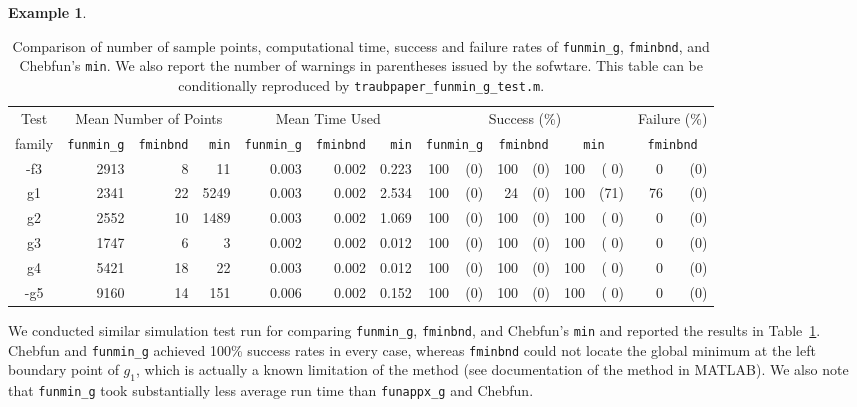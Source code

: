 \documentclass[review]{elsarticle}
\theoremstyle{definition}
\newtheorem{exmp}{Example}
\newcommand{\funappxg}{\texttt{funappx\_g\xspace}}
\newcommand{\funming}{\texttt{funmin\_g\xspace}}
\newcommand{\fminbnd}{\texttt{fminbnd\xspace}}
\begin{document}
\begin{exmp}
%
\begin{table}[bth]
\centering
\caption{Comparison of number of sample points, computational time, success and
failure rates of \funming, \fminbnd, and
Chebfun's \texttt{min}. We also report the number of warnings in parentheses issued by the
sofwtare. This table can be conditionally reproduced by
\texttt{traubpaper\_funmin\_g\_test.m}.}
\label{tab:funmingVsfminbndVsChebfun}
{\footnotesize
\setlength{\tabcolsep}{.11em} %
\begin{tabular}{|c|rrr|rrr|rrrrrr|rr|}
\hline
    Test      &     \multicolumn{3}{c|}{Mean Number of Points} & \multicolumn{3}{c|}{Mean Time Used}  & \multicolumn{6}{|c|}{Success (\%)} &  \multicolumn{2}{c|}{Failure (\%)}
\\  family &  \funming  &  \fminbnd    &  \texttt{min}    & \funming     &  \fminbnd     & \texttt{min}      & \multicolumn{2}{c}{\funming} & \multicolumn{2}{c}{\fminbnd} & \multicolumn{2}{c}{\texttt{min}}  & \multicolumn{2}{|c|}{\fminbnd}
\\ \hline
         -f3   &  2913   &   8   &      11    &   0.003   &    0.002    &  0.223  &    100   &  (0) &  100   &  (0) &  100   &   ( 0)   &   0   & (0)
\\        g1   &  2341   &  22   &    5249    &   0.003   &    0.002    &  2.534  &    100   &  (0) &  24    &  (0) &  100   &   (71)   &   76  & (0)
\\        g2   &  2552   &  10   &    1489    &   0.003   &    0.002    &  1.069  &    100   &  (0) &  100   &  (0) &  100   &   ( 0)   &   0   & (0)
\\        g3   &  1747   &   6   &       3    &   0.002   &    0.002    &  0.012  &    100   &  (0) &  100   &  (0) &  100   &   ( 0)   &   0   & (0)
\\        g4   &  5421   &  18   &      22    &   0.003   &    0.002    &  0.012  &    100   &  (0) &  100   &  (0) &  100   &   ( 0)   &   0   & (0)
\\       -g5   &  9160   &  14   &     151    &   0.006   &    0.002    &  0.152  &    100   &  (0) &  100   &  (0) &  100   &   ( 0)   &   0   & (0)

\\ \hline
\end{tabular}
}
\end{table}
%

We conducted similar simulation test run for comparing \funming, \fminbnd, and
Chebfun's \texttt{min} and reported the results in
Table~\ref{tab:funmingVsfminbndVsChebfun}. Chebfun and \funming{} achieved 100\%
success rates in every case, whereas \fminbnd{} could not locate the global
minimum at the left boundary point of $g_1$, which is actually a known
limitation of the method (see documentation of the method in MATLAB). We also
note that \funming{} took substantially less average run time than \funappxg{}
and Chebfun.



\end{exmp}
\end{document}
